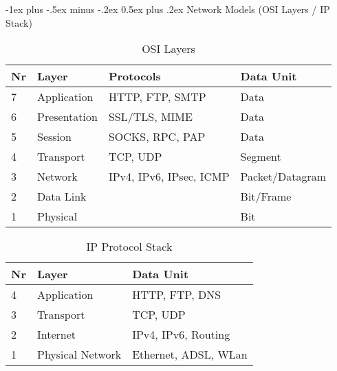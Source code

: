 \documentclass[a4paper,twocolumn]{article}
\makeatletter
\renewcommand{\section}{%
    \@startsection{section}{1}{0mm}%
    {-1ex plus -.5ex minus -.2ex}%
    {0.5ex plus .2ex}%
    {\normalfont\normalsize\bfseries\sectionrule{12pt}{0.4pt}{0pt}{0pt}}
}
\makeatother
\begin{document}
\begin{footnotesize}


\twocolumn
\newpage
\setcounter{page}{1}
\pagestyle{plain}

\section{Network Models (OSI Layers / IP Stack)}
    \begin{table}[h]
        \scriptsize
        \caption{OSI Layers}
        \begin{tabular}{|llll|}
            \hline
            \textbf{Nr} & \textbf{Layer}    & \textbf{Protocols}      & \textbf{Data Unit} \\ \hline
            7           & Application       & HTTP, FTP, SMTP         & Data               \\ \hline
            6           & Presentation      & SSL/TLS, MIME           & Data               \\ \hline
            5           & Session           & SOCKS, RPC, PAP         & Data               \\ \hline
            4           & Transport         & TCP, UDP                & Segment            \\ \hline
            3           & Network           & IPv4, IPv6, IPsec, ICMP & Packet/Datagram    \\ \hline
            2           & Data Link         &                         & Bit/Frame          \\ \hline
            1           & Physical          &                         & Bit                \\ \hline
        \end{tabular}
    \end{table}

    \begin{table}[h]
        \scriptsize
        \caption{IP Protocol Stack}
        \begin{tabular}{|lll|} \hline
            \textbf{Nr} & \textbf{Layer}    & \textbf{Data Unit}    \\ \hline
            4           & Application       & HTTP, FTP, DNS        \\ \hline
            3           & Transport         & TCP, UDP              \\ \hline
            2           & Internet          & IPv4, IPv6, Routing   \\ \hline
            1           & Physical Network  & Ethernet, ADSL, WLan  \\ \hline
        \end{tabular}
    \end{table}
        

\end{footnotesize}
\end{document}
